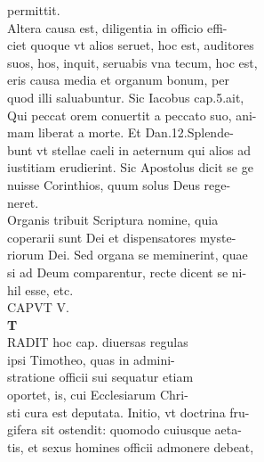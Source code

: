 \documentclass{article}
\begin{document}
\begin{pages}
                permittit. \\
                Altera causa est, diligentia in officio effi- \\
                ciet quoque vt alios seruet, hoc est, auditores \\
                suos, hos, inquit, seruabis vna tecum, hoc est, \\
                eris causa media et organum bonum, per \\
                quod illi saluabuntur. Sic Iacobus cap.5.ait, \\
                Qui peccat orem conuertit a peccato suo, ani- \\
                mam liberat a morte. Et Dan.12.Splende- \\
                bunt vt stellae caeli in aeternum qui alios ad \\
                iustitiam erudierint. Sic Apostolus dicit se ge \\
                nuisse Corinthios, quum solus Deus rege- \\
                neret. \\
                Organis tribuit Scriptura nomine, quia \\
                coperarii sunt Dei et dispensatores myste- \\
                riorum Dei. Sed organa se meminerint, quae \\
                si ad Deum comparentur, recte dicent se ni- \\
                hil esse, etc. \\
                CAPVT V. \\
                \textbf{T \\
                }RADIT hoc cap. diuersas regulas \\
                ipsi Timotheo, quas in admini- \\
                stratione officii sui sequatur etiam \\
                oportet, is, cui Ecclesiarum Chri- \\
                sti cura est deputata. Initio, vt doctrina fru- \\
                gifera sit ostendit: quomodo cuiusque aeta- \\
                tis, et sexus homines officii admonere debeat, \\

\end{pages}
\end{document}
